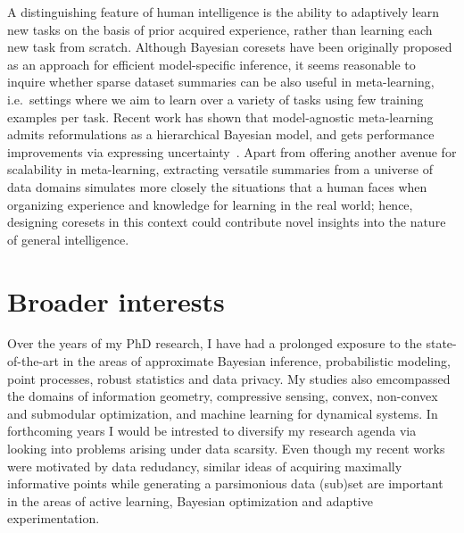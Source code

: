 \documentclass[11pt,a4paper,sans]{moderncv} %
\begin{document}
A distinguishing feature of human intelligence is the ability to adaptively learn new tasks on the basis of prior acquired experience, rather than learning each new task from scratch. Although Bayesian coresets have been originally proposed as an approach for efficient model-specific inference, it seems reasonable to inquire whether sparse dataset summaries can be also useful in meta-learning, i.e.~settings where we aim to learn over a variety of tasks using few training examples per task. Recent work has shown that model-agnostic meta-learning~\citep{finn17} admits reformulations as a hierarchical Bayesian model, and gets performance improvements via expressing uncertainty~\citep{grant18,finn18}. Apart from offering another avenue for scalability in meta-learning, extracting versatile summaries from a universe of data domains simulates more closely the situations that a human faces when organizing experience and knowledge for learning in the real world; hence, designing coresets in this context could contribute novel insights into the nature of general intelligence.

\section{Broader interests}
Over the years of my PhD research, I have had a prolonged exposure to the state-of-the-art in the areas of approximate Bayesian inference, probabilistic modeling, point processes, robust statistics and data privacy. My studies also emcompassed the domains of information geometry, compressive sensing, convex, non-convex and submodular optimization, and machine learning for dynamical systems. In forthcoming years I would be intrested to diversify my research agenda via looking into problems arising under data scarsity. Even though my recent works were motivated by data redudancy, similar ideas of acquiring maximally informative points while generating a parsimonious data (sub)set are important in the areas of active learning, Bayesian optimization and adaptive experimentation. 


\end{document}
